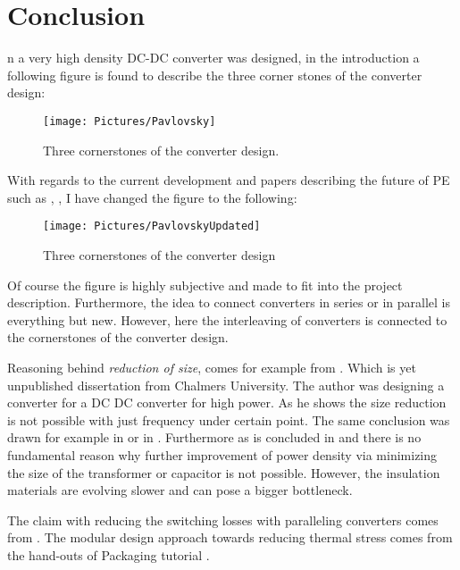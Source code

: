 \documentclass[]{scrartcl}
\begin{document}
\newpage
\section{Conclusion}

n \cite{Pavlovsky2006} a very high density DC-DC converter was designed, in the introduction a following figure is found to describe the three corner stones of the converter design:
\begin{figure}[h!]
	\centering
	\texttt{[image: Pictures/Pavlovsky]}
	\caption{Three cornerstones of the converter design. \cite{Pavlovsky2006}}
	\label{fig:pavlovsky}
\end{figure}

With regards to the current development and papers describing the future of PE such as \cite{VanWyk2013}, \cite{Kolar2014a},\cite{Boroyevich2015} I have changed the figure to the following: 

\begin{figure}[h!]
	\centering
	\texttt{[image: Pictures/PavlovskyUpdated]}
	\caption{Three cornerstones of the converter design}
	\label{fig:pavlovskyupdated}
\end{figure}

\newpage
Of course the figure is highly subjective and made to fit into the project description. Furthermore, the idea to connect converters in series or in parallel is everything but new. However, here the interleaving of converters is connected to the cornerstones of the converter design. 

Reasoning behind \emph{reduction of size}, comes for example from \cite{Bahmani2016a}. Which is yet unpublished dissertation from Chalmers University. The author was designing a converter for a DC DC converter for high power. As he shows the size reduction is not possible with just frequency under certain point. The same conclusion was drawn for example in \cite{Fan2011} or in \cite{Yang2015a}. Furthermore as is concluded in \cite{Hanson2016} and \cite{Kyaw2015} there is no fundamental reason why further improvement of power density via minimizing the size of the transformer  or capacitor is not possible. However, the insulation materials are evolving slower and can pose a bigger bottleneck.


The claim with reducing the switching losses with paralleling converters comes from \cite{Kolar2015a}. The modular design approach towards reducing thermal stress comes from the hand-outs of Packaging tutorial \cite{Faculty2014a}.
\end{document}
